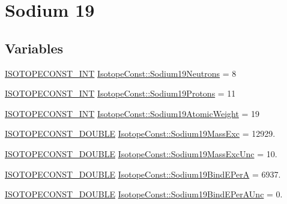 \hypertarget{group___isotope_const-_sodium-_na19}{}\section{Sodium 19}
\label{group___isotope_const-_sodium-_na19}
\subsection*{Variables}
\begin{DoxyCompactItemize}
\item 
\mbox{\hyperlink{group___isotope_const-_macros_ga5f18360b3e99483a35c32d789e62621c}{I\+S\+O\+T\+O\+P\+E\+C\+O\+N\+S\+T\+\_\+\+I\+NT}} \mbox{\hyperlink{group___isotope_const-_sodium-_na19_gaf2b41f0dfea04d6636db5f066b2724ca}{Isotope\+Const\+::\+Sodium19\+Neutrons}} = 8
\item 
\mbox{\hyperlink{group___isotope_const-_macros_ga5f18360b3e99483a35c32d789e62621c}{I\+S\+O\+T\+O\+P\+E\+C\+O\+N\+S\+T\+\_\+\+I\+NT}} \mbox{\hyperlink{group___isotope_const-_sodium-_na19_ga95b3aa0fad0dc86bc826227b3635521a}{Isotope\+Const\+::\+Sodium19\+Protons}} = 11
\item 
\mbox{\hyperlink{group___isotope_const-_macros_ga5f18360b3e99483a35c32d789e62621c}{I\+S\+O\+T\+O\+P\+E\+C\+O\+N\+S\+T\+\_\+\+I\+NT}} \mbox{\hyperlink{group___isotope_const-_sodium-_na19_gaab3f282a367298561b628921492a3249}{Isotope\+Const\+::\+Sodium19\+Atomic\+Weight}} = 19
\item 
\mbox{\hyperlink{group___isotope_const-_macros_ga8f45a7272ce02c0b4c65c44636ed719a}{I\+S\+O\+T\+O\+P\+E\+C\+O\+N\+S\+T\+\_\+\+D\+O\+U\+B\+LE}} \mbox{\hyperlink{group___isotope_const-_sodium-_na19_gaf4561c84c3663803648011058dad8ca9}{Isotope\+Const\+::\+Sodium19\+Mass\+Exc}} = 12929.
\item 
\mbox{\hyperlink{group___isotope_const-_macros_ga8f45a7272ce02c0b4c65c44636ed719a}{I\+S\+O\+T\+O\+P\+E\+C\+O\+N\+S\+T\+\_\+\+D\+O\+U\+B\+LE}} \mbox{\hyperlink{group___isotope_const-_sodium-_na19_gab631ade0eb3263ca3cd06dbfff470be6}{Isotope\+Const\+::\+Sodium19\+Mass\+Exc\+Unc}} = 10.
\item 
\mbox{\hyperlink{group___isotope_const-_macros_ga8f45a7272ce02c0b4c65c44636ed719a}{I\+S\+O\+T\+O\+P\+E\+C\+O\+N\+S\+T\+\_\+\+D\+O\+U\+B\+LE}} \mbox{\hyperlink{group___isotope_const-_sodium-_na19_ga8011a4b379cf7c9a0d7f751cc2c0260c}{Isotope\+Const\+::\+Sodium19\+Bind\+E\+PerA}} = 6937.
\item 
\mbox{\hyperlink{group___isotope_const-_macros_ga8f45a7272ce02c0b4c65c44636ed719a}{I\+S\+O\+T\+O\+P\+E\+C\+O\+N\+S\+T\+\_\+\+D\+O\+U\+B\+LE}} \mbox{\hyperlink{group___isotope_const-_sodium-_na19_ga283f712d5b536fcf00a762138b27286b}{Isotope\+Const\+::\+Sodium19\+Bind\+E\+Per\+A\+Unc}} = 0.

\end{DoxyCompactItemize}
